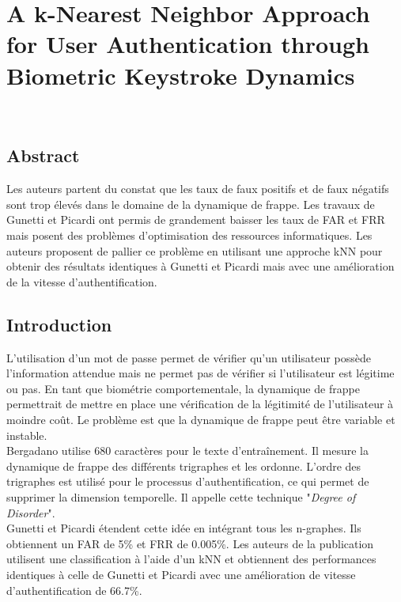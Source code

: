 \section{A k-Nearest Neighbor Approach for User Authentication through Biometric Keystroke Dynamics\cite{Hu2008}}

\\

\subsection{Abstract}

Les auteurs partent du constat que les taux de faux positifs et de faux négatifs sont trop élevés dans le domaine de la dynamique de frappe. Les travaux de Gunetti et Picardi ont permis de grandement baisser les taux de FAR et FRR mais posent des problèmes d'optimisation des ressources informatiques. Les auteurs proposent de pallier ce problème en utilisant une approche kNN pour obtenir des résultats identiques à Gunetti et Picardi mais avec une amélioration de la vitesse d'authentification.\\

\subsection{Introduction}

L'utilisation d'un mot de passe permet de vérifier qu'un utilisateur possède l'information attendue mais ne permet pas de vérifier si l'utilisateur est légitime ou pas. En tant que biométrie comportementale, la dynamique de frappe permettrait de mettre en place une vérification de la légitimité de l'utilisateur à moindre coût. Le problème est que la dynamique de frappe peut être variable et instable.\\

Bergadano utilise 680 caractères pour le texte d'entraînement. Il mesure la dynamique de frappe des différents trigraphes et les ordonne. L'ordre des trigraphes est utilisé pour le processus d'authentification, ce qui permet de supprimer la dimension temporelle. Il appelle cette technique "\textit{Degree of Disorder}".\\

Gunetti et Picardi étendent cette idée en intégrant tous les n-graphes. Ils obtiennent un FAR de 5\% et FRR de 0.005\%. Les auteurs de la publication utilisent une classification à l'aide d'un kNN et obtiennent des performances identiques à celle de Gunetti et Picardi avec une amélioration de vitesse d'authentification de 66.7\%.

